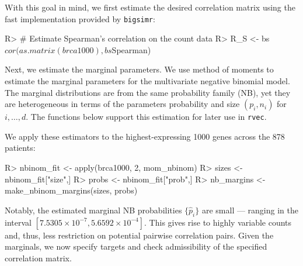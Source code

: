 \documentclass[
]{jss}
\begin{document}
With this goal in mind, we first estimate the desired correlation matrix
using the fast implementation provided by \texttt{bigsimr}:

\begin{CodeChunk}
\begin{CodeInput}
R> # Estimate Spearman's correlation on the count data
R> R_S <- bs$cor(as.matrix(brca1000), bs$Spearman)
\end{CodeInput}
\end{CodeChunk}

Next, we estimate the marginal parameters. We use method of moments to
estimate the marginal parameters for the multivariate negative binomial
model. The marginal distributions are from the same probability family
(NB), yet they are heterogeneous in terms of the parameters probability
and size \((p_i, n_i)\) for \(i,\ldots,d\). The functions below support
this estimation for later use in \texttt{rvec}.

\begin{CodeChunk}
\end{CodeChunk}

We apply these estimators to the highest-expressing 1000 genes across
the 878 patients:

\begin{CodeChunk}
\begin{CodeInput}
R> nbinom_fit <- apply(brca1000, 2, mom_nbinom)
R> sizes <- nbinom_fit["size",]
R> probs <- nbinom_fit["prob",]
R> nb_margins <- make_nbinom_margins(sizes, probs)
\end{CodeInput}
\end{CodeChunk}

Notably, the estimated marginal NB probabilities \(\{ \hat{p}_i \}\) are
small --- ranging in the interval
\([\ensuremath{7.5305\times 10^{-7}} , \ensuremath{5.6592\times 10^{-4}}]\).
This gives rise to highly variable counts and, thus, less restriction on
potential pairwise correlation pairs. Given the marginals, we now
specify targets and check admissibility of the specified correlation
matrix.
\end{document}
